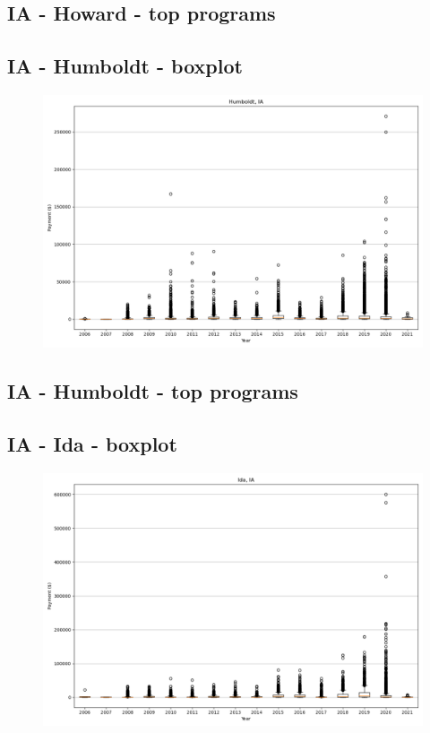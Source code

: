 \subsection*{IA - Howard - top programs}

\newpage
\subsection*{IA - Humboldt - boxplot}
\begin{figure}[h]
\centering
\includegraphics[width=7in]{../output/boxplots/counties/Humboldt-IA_boxplot.png}
\end{figure}


\subsection*{IA - Humboldt - top programs}

\newpage
\subsection*{IA - Ida - boxplot}
\begin{figure}[h]
\centering
\includegraphics[width=7in]{../output/boxplots/counties/Ida-IA_boxplot.png}
\end{figure}


